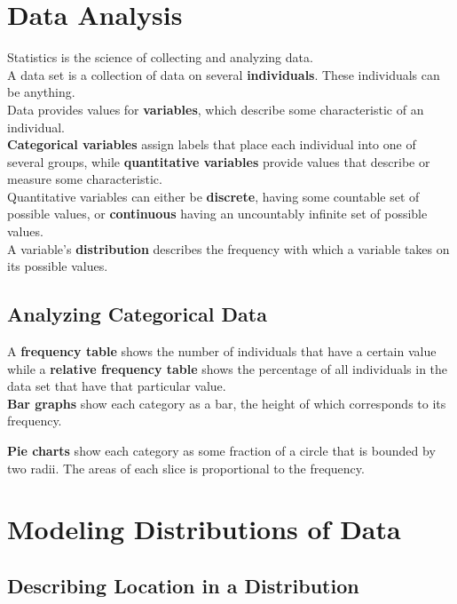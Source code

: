 \documentclass[../AP_Statistics.tex]{subfiles}
\begin{document}
	\section{Data Analysis}
		Statistics is the science of collecting and analyzing data. \\
		A data set is a collection of data on several \textbf{individuals}. These individuals can be anything. \\
		Data provides values for \textbf{variables}, which describe some characteristic of an individual. \\
		\textbf{Categorical variables} assign labels that place each individual into one of several groups, while \textbf{quantitative variables} provide values that describe or measure some characteristic. \\
		Quantitative variables can either be \textbf{discrete}, having some countable set of possible values, or \textbf{continuous} having an uncountably infinite set of possible values. \\
		A variable's \textbf{distribution} describes the frequency with which a variable takes on its possible values.
		\subsection{Analyzing Categorical Data}
			A \textbf{frequency table} shows the number of individuals that have a certain value while a \textbf{relative frequency table} shows the percentage of all individuals in the data set that have that particular value. \\
			\textbf{Bar graphs} show each category as a bar, the height of which corresponds to its frequency. \\
			\begin{center}
			\end{center}
			\textbf{Pie charts} show each category as some fraction of a circle that is bounded by two radii. The areas of each slice is proportional to the frequency.
	\section{Modeling Distributions of Data}
		\subsection{Describing Location in a Distribution}
		
\end{document}

